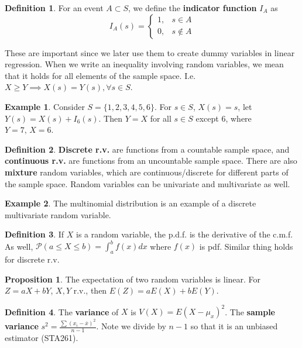 \documentclass[12pt, a4paper]{article}
\theoremstyle{definition}
\newtheorem{proposition}{Proposition}
\newtheorem{definition}{Definition}
\newtheorem{example}{Example}
\newcommand{\PP}{\mathcal{P}}                         %
\newcommand{\imp}{\implies}
\newcommand{\all}{\forall}
\newcommand{\ol}{\overline}
\newcommand{\f}{\frac}
\begin{document}
	\begin{definition}
		For an event $A \subset S$, we define the {\bf indicator function} $I_A$ as
		$$
			I_A(s) = \begin{cases}
				1, & s\in A \\
				0, & s\notin A
			\end{cases}
		$$
	\end{definition}

	These are important since we later use them to create dummy variables in linear regression. When we write an inequality involving random variables, we mean that it holds for all elements of the sample space. I.e. $X \geq Y \imp X(s) = Y(s), \all s \in S$.\\
	
	\begin{example}
		Consider $S = \{1,2,3,4,5,6\}$. For $s \in S$, $X(s) = s$, let $Y(s) = X(s) + I_6(s)$. Then $Y = X$ for all $s \in S$ except $6$, where $Y = 7,\, X = 6$. 
	\end{example}
	
	
	\begin{definition}
		{\bf Discrete r.v.} are functions from a countable sample space, and {\bf continuous r.v.} are functions from an uncountable sample space. There are also {\bf mixture} random variables, which are continuous/discrete for different parts of the sample space. Random variables can be univariate and multivariate as well.
	\end{definition}	
	
	\begin{example}
		The multinomial distribution is an example of a discrete multivariate random variable.
	\end{example}
	
	\begin{definition}
		If $X$ is a random variable, the p.d.f. is the derivative of the c.m.f. As well, $\PP(a \leq X \leq b) = \int_a^b f(x)dx$ where $f(x)$ is pdf. Similar thing holds for discrete r.v.
	\end{definition}

	\begin{proposition}
		The expectation of two random variables is linear. For $Z = aX + bY$, $X,Y$ r.v., then $E(Z) = aE(X) + bE(Y)$.
	\end{proposition}

	\begin{definition}
		The {\bf variance} of $X$ is $V(X) = E(X - \mu_x)^2$. The {\bf sample variance} $s^2 = \f{\sum (x_i - \ol{x})^2}{n-1}$. Note we divide by $n-1$ so that it is an unbiased estimator (STA261).
	\end{definition}
\end{document}
